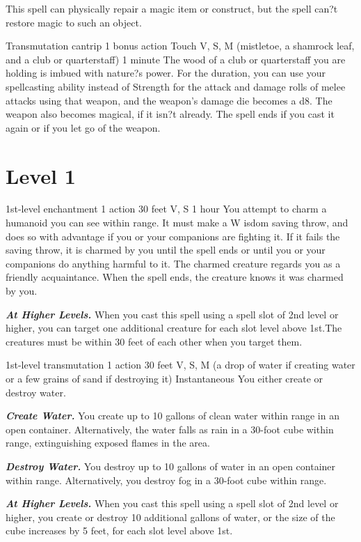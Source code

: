 \documentclass[10pt,twoside,twocolumn,openany]{book}
\newcommand\impact[1]{
	\textbf{\textit{#1}}
}
\begin{document}
This spell can physically repair a magic item or construct, but the spell can?t restore magic to such an object.

{Transmutation cantrip}
{\color{bonusaction} 1 bonus action}
{Touch}
{V, S, M  (mistletoe, a shamrock leaf, and a club or quarterstaff)}
{1 minute}
%
The wood of a club or quarterstaff you are holding is imbued with nature?s power. For the duration, you can use your spellcasting ability instead of Strength for the attack and damage rolls of melee attacks using that weapon, and the weapon's damage die becomes a d8. The weapon also becomes magical, if it isn?t already. The spell ends if you cast it again or if you let go of the weapon.

\clearpage
\section{Level 1}
{1st-level enchantment}
{\color{action} 1 action}
{30 feet}
{V, S}
{1 hour}
%
You attempt to charm a humanoid you can see within range. It must make a W isdom saving throw, and does so with advantage if you or your companions are fighting it. If it fails the saving throw, it is charmed by you until the spell ends or until you or your companions do anything harmful to it. The charmed creature regards you as a friendly acquaintance. When the spell ends, the creature knows it was charmed by you.

\impact{At Higher Levels.} When you cast this spell using a spell slot of 2nd level or higher, you can target one additional creature for each slot level above 1st.The creatures must be within 30 feet of each other when you target them.

{1st-level transmutation}
{\color{action} 1 action}
{30 feet}
{V, S, M (a drop of water if creating water or a few grains of sand if destroying it)}
{Instantaneous}
%
You either create or destroy water.

\impact{Create Water.} You create up to 10 gallons of clean
water within range in an open container. Alternatively, the water falls as rain in a 30-foot cube within range, extinguishing exposed flames in the area.

\impact{Destroy Water.} You destroy up to 10 gallons of water in an open container within range. Alternatively, you destroy fog in a 30-foot cube within range.

\impact{At Higher Levels.} When you cast this spell using a spell slot of 2nd level or higher, you create or destroy 10 additional gallons of water, or the size of the cube increases by 5 feet, for each slot level above 1st.
\end{document}
